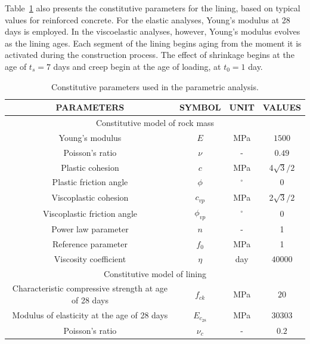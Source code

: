 \documentclass[a4paper,fleqn]{cas-sc}
\begin{document}
Table~\ref{table2} also presents the constitutive parameters for the lining, based on typical values for reinforced concrete. For the elastic analyses, Young's modulus at 28 days is employed. In the viscoelastic analyses, however, Young's modulus evolves as the lining ages. Each segment of the lining begins aging from the moment it is activated during the construction process. The effect of shrinkage begins at the age of $t_s = 7$ days and creep begin at the age of loading, at $t_0 = 1$ day.

\begin{table}[h!]
	\caption{Constitutive parameters used in the parametric analysis.}
	\label{table2}
	\centering
	\renewcommand{\arraystretch}{1.25}
	\begin{tabular}{c c c c}
		\hline
		\multicolumn{1}{c}{PARAMETERS} &
		\multicolumn{1}{c}{SYMBOL} &
		\multicolumn{1}{c}{UNIT} &
		\multicolumn{1}{c}{VALUES} \\
		\hline
		\multicolumn{4}{c}{Constitutive model of rock mass} \\
		\hline
		Young's modulus & $E$ & MPa & $1500$ \\
		Poisson's ratio & $\nu$ & - & $0.49$ \\
		Plastic cohesion & $c$ & MPa & 4$\sqrt{3}/2$ \\
		Plastic friction angle & $\phi$ & $^{\circ}$ & 0 \\
		Viscoplastic cohesion & $c_{vp}$ & MPa & 2$\sqrt{3}/2$ \\
		Viscoplastic friction angle & $\phi_{vp}$ & $^{\circ}$ & 0 \\
		Power law parameter & $n$ & - & 1 \\
		Reference parameter & $f_0$ & MPa & 1 \\
		Viscosity coefficient & $\eta$ & day & $40000$ \\
		\hline
		\multicolumn{4}{c}{Constitutive model of lining} \\
		\hline
		
		Characteristic compressive strength at age of 28 days & $f_{ck}$ & MPa & $20$ \\
		Modulus of elasticity at the age of 28 days & $E_{c_{28}}$ & MPa & $30303$ \\
		Poisson's ratio & $\nu_c$ & - & $0.2$ \\
		

\end{tabular}
\end{table}
\end{document}
